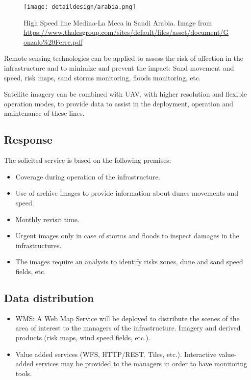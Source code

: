 \begin{figure}[!h]
\begin{center}
\texttt{[image: detaildesign/arabia.png]}
\caption[High Speed line Medina-La Meca in Saudi Arabia]{High Speed line Medina-La Meca in Saudi Arabia. Image from \url{https://www.thalesgroup.com/sites/default/files/asset/document/Gonzalo\%20Ferre.pdf}}
\label{fig:arabia}
\end{center}
\end{figure}

Remote sensing technologies can be applied to assess the risk of affection in the infrastructure and to minimize and prevent the impact: Sand movement and speed, risk maps, sand storms monitoring, floods monitoring, etc.

Satellite imagery can be combined with \ac{UAV}, with
higher resolution and flexible operation modes, to provide data to assist in the
deployment, operation and maintenance of these lines. 

\subsection{Response}
The solicited service is based on the following premises:
\begin{itemize}
\item Coverage during operation of the infrastructure.
\item Use of archive images to provide information about dunes movements and speed.
\item Monthly revisit time.
\item Urgent images only in case of storms and floods to inspect damages in the infrastructures.
\item The images require an analysis to identify risks zones, dune and sand
  speed fields, etc.
\end{itemize}

\subsection{Data distribution}
\begin{itemize}
\item \ac{WMS}: A Web Map Service will be deployed to distribute the scenes of the area of interest to the managers of the infrastructure. Imagery and derived products (risk maps, wind speed fields, etc.). 
\item Value added services (WFS, HTTP/REST, Tiles, etc.). Interactive value-added services may be provided to the managers in order to have monitoring tools. 
\end{itemize}
